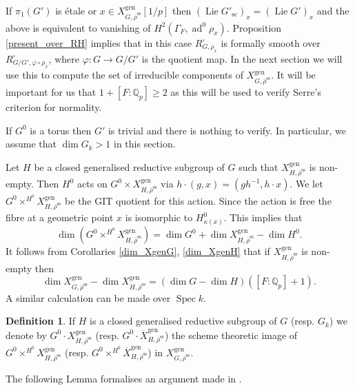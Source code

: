 \documentclass{amsart}
\theoremstyle{definition}
\newtheorem{defi}[prop]{Definition}
\theoremstyle{remark}
\DeclareMathOperator{\Spec}{Spec}
\newcommand{\Qp}{\mathbb {Q}_p}
\DeclareMathOperator{\ad}{ad}
\newcommand{\rhobar}{\overline{\rho}}
\newcommand{\gen}{\mathrm{gen}}
\newcommand{\Xbar}{\overline{X}}
\DeclareMathOperator{\Lie}{Lie}
\newcommand{\rhobarss}{\rhobar^{\mathrm{ss}}}
\newcommand{\sic}{\operatorname{sc}}
\begin{document}
If $\pi_1(G')$ is \'etale  or 
$x\in X^{\gen}_{G,\rhobarss}[1/p]$  then $(\Lie G'_{\sic})_x = (\Lie G')_x$ and the above is equivalent to vanishing of  
$H^2(\Gamma_F, \ad^0 \rho_x)$. Proposition \ref{present_over_RH} implies that in this case
$R^{\square}_{G, \rho_x}$ is formally smooth over $R^{\square}_{G/G', \varphi\circ\rho_x}$, 
where $\varphi: G \rightarrow G/G'$ is the quotient map. In the next section we will use 
this to compute the set of irreducible components of $X^{\gen}_{G, \rhobarss}$. It will be important 
for us that $1+[F:\Qp]\ge 2$ as this will be used to verify Serre's criterion for normality.



If $G^0$ is a torus then $G'$ is trivial and there is nothing to verify. In particular, 
we assume that $\dim G_k >1$ in this section.  

Let $H$ be a closed generalised reductive subgroup of $G$ such that $X^{\gen}_{H, \rhobarss}$ is non-empty. 
Then $H^0$ acts on $G^0 \times X^{\gen}_{H, \rhobarss}$ via $h\cdot(g, x)= (gh^{-1}, h \cdot x)$.
We let $G^0\times^{H^0} X^{\gen}_{H, \rhobarss}$ be the GIT quotient
for this action. Since the action is free the fibre at a geometric point 
$x$ is isomorphic to $H^0_{\kappa(x)}$. This implies that 
\begin{equation}\label{dim_again_1}
 \dim (G^0\times^{H^0} X^{\gen}_{H, \rhobarss})= \dim G^0 + \dim X^{\gen}_{H, \rhobarss} -\dim H^0.
\end{equation}
It follows from Corollaries  \ref{dim_XgenG}, \ref{dim_XgenH} that if $X^{\gen}_{H, \rhobarss}$ is non-empty then 
\begin{equation}\label{dim_again_2}
 \dim X^{\gen}_{G, \rhobarss} - \dim X^{\gen}_{H, \rhobarss}= (\dim G -\dim H) ([F:\Qp]+1).
\end{equation}
A similar calculation can be made over $\Spec k$. 

\begin{defi} If $H$ is a closed generalised reductive subgroup of $G$ (resp. $G_k$) we denote 
by $G^0\cdot X^{\gen}_{H, \rhobarss}$ (resp. $G^0\cdot \Xbar^{\gen}_{H, \rhobarss}$) the scheme theoretic image 
of $G^0\times^{H^0} X^{\gen}_{H, \rhobarss}$ (resp. $G^0\times^{H^0} \Xbar^{\gen}_{H, \rhobarss}$) in $X^{\gen}_{G, \rhobarss}$. 
\end{defi}
The following Lemma formalises an argument made in \cite[Proposition 3.8]{BIP_new}.
\end{document}

